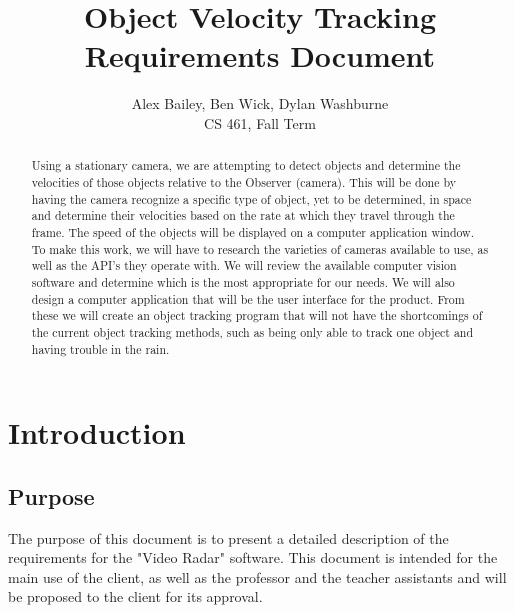 \documentclass[letterpaper,10pt,onecolumn,draftclsnofoot]{IEEEtran}
\title{Object Velocity Tracking Requirements Document}
\author{Alex Bailey, Ben Wick, Dylan Washburne\\CS 461, Fall Term}
\begin{document}
\begin{titlepage}

\maketitle

\begin{abstract}
Using a stationary camera, we are attempting to detect objects and determine the velocities of those objects relative to the Observer (camera).
This will be done by having the camera recognize a specific type of object, yet to be determined, in space and determine their velocities based on the rate at which they travel through the frame.
The speed of the objects will be displayed on a computer application window.
To make this work, we will have to research the varieties of cameras available to use, as well as the API’s they operate with.
We will review the available computer vision software and determine which is the most appropriate for our needs.
We will also design a computer application that will be the user interface for the product.
From these we will create an object tracking program that will not have the shortcomings of the current object tracking methods, such as being only able to track one object and having trouble in the rain.

 
\end{abstract}

\end{titlepage}


\section{Introduction}
\subsection{Purpose}
The purpose of this document is to present a detailed description of the requirements for the "Video Radar" software.
This document is intended for the main use of the client, as well as the professor and the teacher assistants and will be proposed to the client for its approval.
\end{document}
